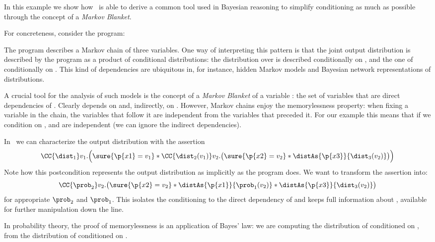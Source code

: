 \documentclass[acmsmall,nonacm,screen,appendix]{acmart}
\begin{document}
In this example we show how \thelogic\ is able to derive a common
tool used in Bayesian reasoning to simplify conditioning as much as possible
through the concept of a \emph{Markov Blanket}.

For concreteness, consider the program:
\begin{center}
\end{center}
The program describes a Markov chain of three variables.
One way of interpreting this pattern is that the joint output distribution
is described by the program as a product of conditional distributions:
the distribution over  is described conditionally on ,
and the one of  conditionally on .
This kind of dependencies are ubiquitous in, for instance, hidden Markov models and Bayesian network representations of distributions.

A crucial tool for the analysis of such models is the concept of a
\emph{Markov Blanket} of a variable : the set of variables that are direct dependencies of .
Clearly  depends on  and, indirectly, on .
However, Markov chains enjoy the memorylessness property:
when fixing a variable in the chain, the variables that follow it are independent from the variables that preceded it.
For our example this means that if we condition on ,
 and  are independent (\ie we can ignore the indirect dependencies).

In \thelogic\ we can characterize the output distribution with the assertion
\[
  \CC{\dist_1} v_1. \Bigl(
    \sure{\p{x1}=v_1} *
    \CC{\dist_2(v_1)} v_2. \bigl(
      \sure{\p{x2}=v_2} *
      \distAs{\p{x3}}{\dist_3(v_2)}
    \bigr)
  \Bigr)
\]
Note how this postcondition represents the output distribution
as implicitly as the program does.
We want to transform the assertion into:
\[
  \CC{\prob_2} v_2.
  \bigl(
    \sure{\p{x2}=v_2} *
    \distAs{\p{x1}}{\prob_1(v_2)} *
    \distAs{\p{x3}}{\dist_3(v_2)}
  \bigr)
\]
for appropriate $\prob_2$ and $\prob_1$.
This isolates the conditioning to the direct dependency of 
and keeps full information about ,
available for further manipulation down the line.

In probability theory, the proof of memorylessness is an application
of Bayes' law: we are computing
the distribution of  conditioned on ,
from the distribution of  conditioned on .
\end{document}
